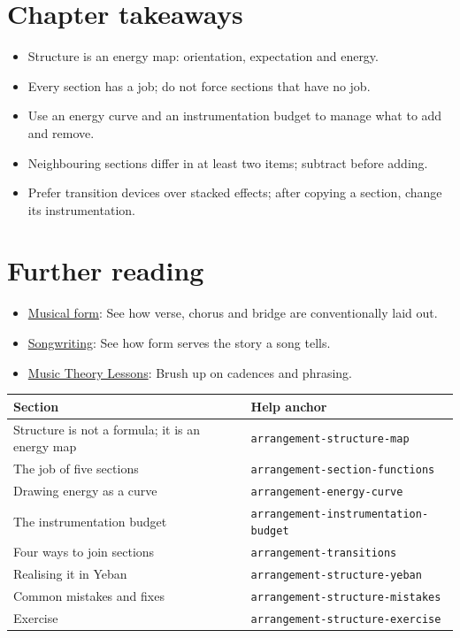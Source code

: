 \section{Chapter takeaways}
\label{sec:structure-takeaways}

\begin{itemize}
\item Structure is an energy map: orientation, expectation and energy.
\item Every section has a job; do not force sections that have no job.
\item Use an energy curve and an instrumentation budget to manage what to add and remove.
\item Neighbouring sections differ in at least two items; subtract before adding.
\item Prefer transition devices over stacked effects; after copying a section, change its instrumentation.
\end{itemize}

\section{Further reading}
\label{sec:02-structure-further-reading}
\begin{itemize}
  \item \href{https://en.wikipedia.org/wiki/Musical_form}{Musical form}: See how verse, chorus and bridge are conventionally laid out.
  \item \href{https://en.wikipedia.org/wiki/Songwriting}{Songwriting}: See how form serves the story a song tells.
  \item \href{https://www.musictheory.net/lessons}{Music Theory Lessons}: Brush up on cadences and phrasing.
\end{itemize}

\begin{helpmapping}
\begin{longtable}{p{}p{}}
\toprule
Section & Help anchor \\
\midrule
Structure is not a formula; it is an energy map & \texttt{arrangement-structure-map} \\
The job of five sections & \texttt{arrangement-section-functions} \\
Drawing energy as a curve & \texttt{arrangement-energy-curve} \\
The instrumentation budget & \texttt{arrangement-instrumentation-budget} \\
Four ways to join sections & \texttt{arrangement-transitions} \\
Realising it in Yeban & \texttt{arrangement-structure-yeban} \\
Common mistakes and fixes & \texttt{arrangement-structure-mistakes} \\
Exercise & \texttt{arrangement-structure-exercise} \\
\bottomrule
\end{longtable}
\end{helpmapping}
